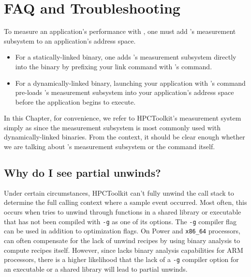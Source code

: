 \documentclass[11pt,letterpaper]{report}
\begin{document}

\chapter{FAQ and Troubleshooting}
\label{chpt:faq-troubleshooting}

To measure an application's performance with \HPCToolkit, one must add
\HPCToolkit's measurement subsystem to an application's address
space.
\begin{itemize}
\item
For a statically-linked binary, one adds \HPCToolkit's
measurement subsystem directly into the binary
by prefixing your link command
with \HPCToolkit{}'s \hpclink{} command.
\item
For a dynamically-linked
binary, launching your application with \HPCToolkit's \hpcrun{}
command pre-loads \HPCToolkit's measurement subsystem into your
application's address space before the application begins to execute.
\end{itemize}
In this Chapter, for convenience, we refer to HPCToolkit's measurement
system simply as \hpcrun{} since the measurement subsystem is most commonly used
with dynamically-linked binaries. From the context, it should be clear enough
whether we are talking about \HPCToolkit's measurement subsystem
or the \hpcrun{} command itself.

\section{Why do I see partial unwinds?}
\label{sec:partial}

Under certain circumstances, HPCToolkit can't fully unwind the call
stack to determine the full calling context where a sample event
occurred. Most often, this occurs when \hpcrun{} tries to unwind
through functions in a shared library or executable that has not
been compiled with \verb|-g| as one of its options. The \verb|-g|
compiler flag can be used in addition to optimization flags. On
Power and \verb|x86_64| processors, \hpcrun{} can often compensate
for the lack of unwind recipes by using
binary analysis to compute recipes itself. However, since \hpcrun{}
lacks binary analysis capabilities for ARM processors, there is a
higher likelihood that the lack of a \verb|-g| compiler option for
an executable or a shared library will lead to partial unwinds.
\end{document}
